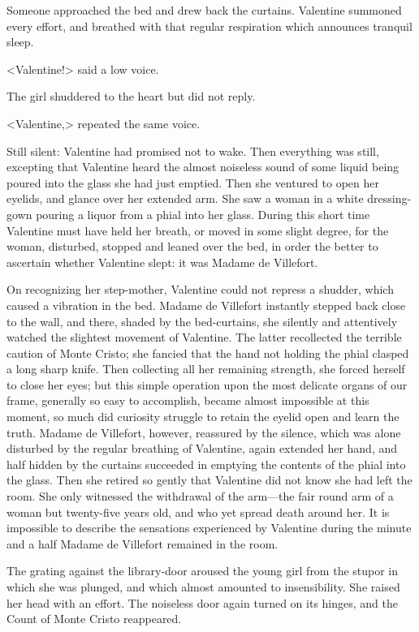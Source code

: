  Someone approached the bed and drew back the curtains. Valentine summoned every effort, and breathed with that regular respiration which announces tranquil sleep. 

 <Valentine!> said a low voice. 

 The girl shuddered to the heart but did not reply. 

 <Valentine,> repeated the same voice. 

 Still silent: Valentine had promised not to wake. Then everything was still, excepting that Valentine heard the almost noiseless sound of some liquid being poured into the glass she had just emptied. Then she ventured to open her eyelids, and glance over her extended arm. She saw a woman in a white dressing-gown pouring a liquor from a phial into her glass. During this short time Valentine must have held her breath, or moved in some slight degree, for the woman, disturbed, stopped and leaned over the bed, in order the better to ascertain whether Valentine slept: it was Madame de Villefort. 

 On recognizing her step-mother, Valentine could not repress a shudder, which caused a vibration in the bed. Madame de Villefort instantly stepped back close to the wall, and there, shaded by the bed-curtains, she silently and attentively watched the slightest movement of Valentine. The latter recollected the terrible caution of Monte Cristo; she fancied that the hand not holding the phial clasped a long sharp knife. Then collecting all her remaining strength, she forced herself to close her eyes; but this simple operation upon the most delicate organs of our frame, generally so easy to accomplish, became almost impossible at this moment, so much did curiosity struggle to retain the eyelid open and learn the truth. Madame de Villefort, however, reassured by the silence, which was alone disturbed by the regular breathing of Valentine, again extended her hand, and half hidden by the curtains succeeded in emptying the contents of the phial into the glass. Then she retired so gently that Valentine did not know she had left the room. She only witnessed the withdrawal of the arm—the fair round arm of a woman but twenty-five years old, and who yet spread death around her.  It is impossible to describe the sensations experienced by Valentine during the minute and a half Madame de Villefort remained in the room. 

 The grating against the library-door aroused the young girl from the stupor in which she was plunged, and which almost amounted to insensibility. She raised her head with an effort. The noiseless door again turned on its hinges, and the Count of Monte Cristo reappeared. 

